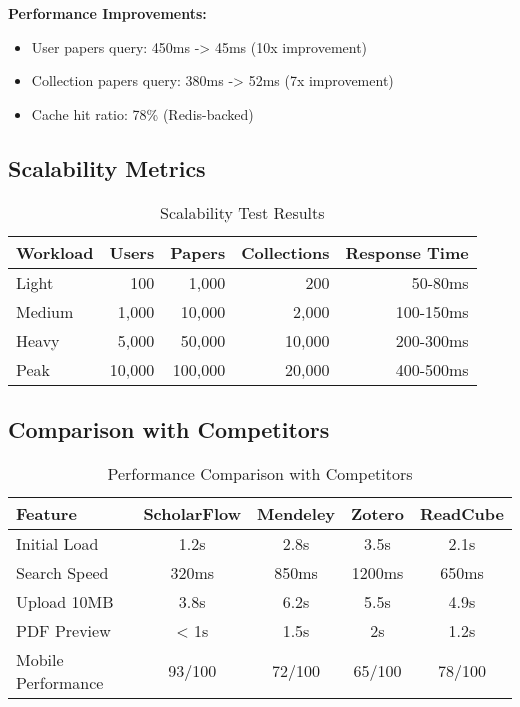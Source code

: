 \textbf{Performance Improvements:}
\begin{itemize}[leftmargin=*,topsep=3pt,itemsep=2pt]
    \item User papers query: 450ms -> 45ms (10x improvement)
    \item Collection papers query: 380ms -> 52ms (7x improvement)
    \item Cache hit ratio: 78\% (Redis-backed)
\end{itemize}

\subsection{Scalability Metrics}

\begin{table}[H]
\centering
\begin{tabular}{@{}lrrrr@{}}
\toprule
\textbf{Workload} & \textbf{Users} & \textbf{Papers} & \textbf{Collections} & \textbf{Response Time} \\ 
\midrule
Light & 100 & 1,000 & 200 & 50-80ms \\
Medium & 1,000 & 10,000 & 2,000 & 100-150ms \\
Heavy & 5,000 & 50,000 & 10,000 & 200-300ms \\
Peak & 10,000 & 100,000 & 20,000 & 400-500ms \\
\bottomrule
\end{tabular}
\caption{Scalability Test Results}
\label{tab:scalability}
\end{table}

\subsection{Comparison with Competitors}

\begin{table}[H]
\centering
\begin{tabular}{@{}lcccc@{}}
\toprule
\textbf{Feature} & \textbf{ScholarFlow} & \textbf{Mendeley} & \textbf{Zotero} & \textbf{ReadCube} \\ 
\midrule
Initial Load & 1.2s & 2.8s & 3.5s & 2.1s \\
Search Speed & 320ms & 850ms & 1200ms & 650ms \\
Upload 10MB & 3.8s & 6.2s & 5.5s & 4.9s \\
PDF Preview & < 1s & 1.5s & 2s & 1.2s \\
Mobile Performance & 93/100 & 72/100 & 65/100 & 78/100 \\
\bottomrule
\end{tabular}
\caption{Performance Comparison with Competitors}
\label{tab:comparison}
\end{table}

